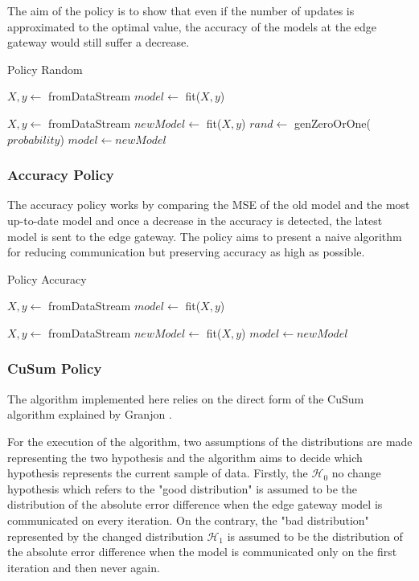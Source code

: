 \documentclass{mpaper}
\begin{document}
The aim of the policy is to show that even if the number of updates is approximated to the optimal value, the accuracy of the models at the edge gateway would still suffer a decrease.

\begin{algorithm}[h]
\caption{Policy Random}\label{polR}
\begin{algorithmic}
\State $X,y \gets$ fromDataStream
\State $model \gets$ fit($X,y$)

    \State $X, y \gets$ fromDataStream
    \State $newModel \gets$ fit($X,y$)
    \State $rand \gets$ genZeroOrOne($probability$)
        \State $model \gets newModel$ 
    \EndIf
\EndWhile
\end{algorithmic}
\end{algorithm}

\subsubsection{Accuracy Policy}
The accuracy policy works by comparing the MSE of the old model and the most up-to-date model and once a decrease in the accuracy is detected, the latest model is sent to the edge gateway.
The policy aims to present a naive algorithm for reducing communication but preserving accuracy as high as possible.

\begin{algorithm}[h]
\caption{Policy Accuracy}\label{polA}
\begin{algorithmic}
\State $X, y \gets$ fromDataStream
\State $model \gets$ fit($X,y$)

    \State $X, y \gets$ fromDataStream
    \State $newModel \gets$ fit($X,y$)
        \State $model \gets newModel$ 
    \EndIf
\EndWhile
\end{algorithmic}
\end{algorithm}

\subsubsection{CuSum Policy}
The algorithm implemented here relies on the direct form of the CuSum algorithm explained by Granjon \cite{cusum_pierre}.

For the execution of the algorithm, two assumptions of the distributions are made representing the two hypothesis and the algorithm aims to decide which hypothesis represents the current sample of data. 
Firstly, the $\mathcal{H}_0$ no change hypothesis which refers to the "good distribution" is assumed to be the distribution of the absolute error difference when the edge gateway model is communicated on every iteration. On the contrary, the "bad distribution" represented by the changed distribution $\mathcal{H}_1$ is assumed to be the distribution of the absolute error difference when the model is communicated only on the first iteration and then never again.
\end{document}
